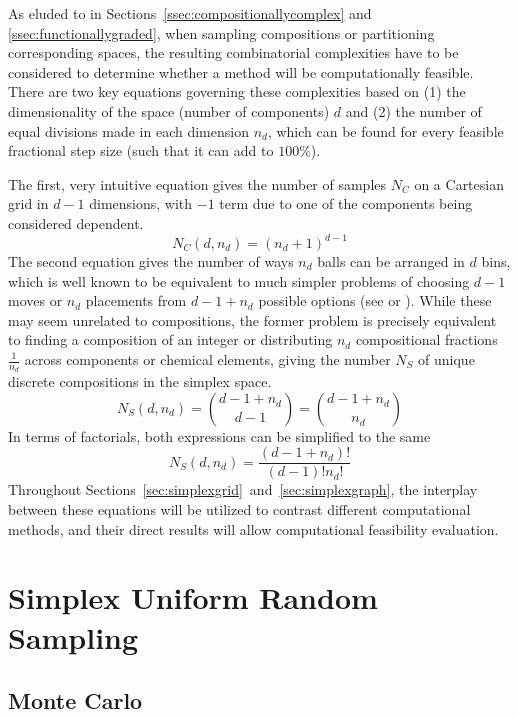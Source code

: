 As eluded to in Sections~\ref{ssec:compositionallycomplex} and \ref{ssec:functionallygraded}, when sampling compositions or partitioning corresponding spaces, the resulting combinatorial complexities have to be considered to determine whether a method will be computationally feasible. There are two key equations governing these complexities based on (1) the dimensionality of the space (number of components) $d$ and (2) the number of equal divisions made in each dimension $n_d$, which can be found for every feasible fractional step size (such that it can add to $100\%$). 

The first, very intuitive equation gives the number of samples $N_C$ on a Cartesian grid in $d-1$ dimensions, with $-1$ term due to one of the components being considered dependent.
\begin{equation}
    N_C(d, n_d) = (n_d+1)^{d-1}
    \label{eq:nc}
\end{equation}
The second equation gives the number of ways $n_d$ balls can be arranged in $d$ bins, which is well known to be equivalent to much simpler problems of choosing $d-1$ moves or $n_d$ placements from $d-1+n_d$ possible options (see \cite{Nijenhuis1978CombinatorialCalculators} or \cite{Chasalow1995AlgorithmPoints}). While these may seem unrelated to compositions, the former problem is precisely equivalent to finding a composition of an integer or distributing $n_d$ compositional fractions $\frac{1}{n_d}$ across components or chemical elements, giving the number $N_S$ of unique discrete compositions in the simplex space.
\begin{equation}
    N_S(d, n_d) = \binom{d-1+n_d}{d-1} = \binom{d-1+n_d}{n_d}
    \label{eq:ns1}
\end{equation}
In terms of factorials, both expressions can be simplified to the same
\[N_S(d, n_d) = \frac{(d - 1 + n_d)!}{(d-1)!n_d!}\]
Throughout Sections~\ref{sec:simplexgrid}~and~\ref{sec:simplexgraph}, the interplay between these equations will be utilized to contrast different computational methods, and their direct results will allow computational feasibility evaluation. 


\section{Simplex Uniform Random Sampling} \label{sec:randomuniformsampling}

\subsection{Monte Carlo} \label{ssec:mc}

